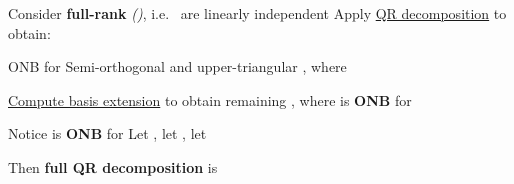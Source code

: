 \begin{itemize}

      \vItem
            Consider \textbf{full-rank}
            \emph{()},
            i.e.~
            are linearly independent
      \vItem
            Apply \ul{QR decomposition} to obtain:

            \begin{itemize}

                  \vItem
                        ONB
                        for 
                  \vItem
                        Semi-orthogonal
                        and upper-triangular ,
                        where 
            \end{itemize}
      \vItem
            \ul{Compute basis extension} to obtain remaining
            ,
            where 
            is \textbf{ONB} for 

            \begin{itemize}

                  \vItem
                        Notice
                         is
                        \textbf{ONB} for 
                  \vItem
                        Let
                        ,
                        let , let
            \end{itemize}
      \vItem
            Then \textbf{full QR decomposition} is


\end{itemize}
